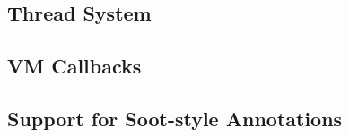 \JavaTMFooter

\JikesTMFooter

\subsection{Thread System}\label{sec:threads}



\subsection{VM Callbacks}\label{sssec:callbacks}


\subsection{Support for Soot-style Annotations}\label{sssec:annotations}



